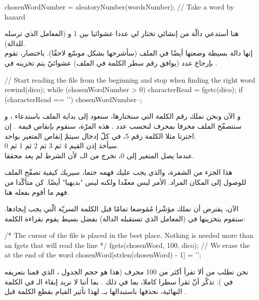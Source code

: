 \begin{Csource}
chosenWordNumber = aleatoryNumber(wordsNumber); // Take a word by hazard
\end{Csource}

هنا أستدعي دالّة من إنشائي تختار لي عددا عشوائيا بين 1 و
(المعامل الذي ترسله للدالة).\\
إنها دالة بسيطة وضعتها أيضًا في الملف
(سأشرحها بشكل موسّع لاحقًا). باختصار، تقوم بإرجاع عدد (يوافق رقم سطر الكلمة في الملف) عشوائيّ يتم تخزينه في
.

\begin{Csource}
// Start reading the file from the beginning and stop when finding the right word
rewind(dico);
while (chosenWordNumber > 0)
{
	characterRead = fgetc(dico);
	if (characterRead == '\n')
    	 chosenWordNumber--;
}
\end{Csource}

و الآن ونحن نملك رقم الكلمة التي سنختارها، سنعود إلى بداية الملف باستدعاء
،
و سنتصفّح الملف محرفا بمحرف لنحسب عدد
.
هذه المرّة، سنقوم بإنقاص قيمة
.
إن اخترنا مثلا الكلمة رقم 5، في كلّ إدخال سيتمّ إنقاص المتغير
بواحد.\\
سيأخذ إذن القيم 4 ثم 3 ثم 2 ثم 1 ثم 0. \\
عندما يصل المتغير إلى 0، نخرج من الـ،
لأن الشرط
لم يعد محققا.

هذا الجزء من الشفرة، والذي يجب عليك فهمه حتما، سيريك كيفية تصفّح الملف للوصول إلى المكان المراد. الأمر ليس معقّدا ولكنه ليس "بديهيا" أيضًا. كن متأكّدا من فهم ما أقوم بفعله هنا.

الآن، يفترض أن نملك مؤشّرا مُمَوضعا تمامًا قبل الكلمة السريّة الّتي يجب إيجادها.
سنقوم بتخزينها في
(المعامل الذي تستقبله الدالة) بفضل
بسيط يقوم بقراءة الكلمة:

\begin{Csource}
/* The cursor of the file is placed in the best place.
Nothing is needed more than an fgets that will read the line */
fgets(chosenWord, 100, dico);
// We erase the \n at the end of the word
chosenWord[strlen(chosenWord) - 1] = '\0';
\end{Csource}

نحن نطلب من
ألا تقرأ أكثر من 100 محرف (هذا هو حجم الجدول
،
الذي قمنا بتعريفه في ).
تذكّر أنّ
تقرأ سطرا كاملا، بما في ذلك
.
بما أننا لا نريد إبقاء الـ
في الكلمة النهائية، نحذفها باستبدالها بـ.
لهذا تأثير القيام بقطع الكلمة قبل
.

